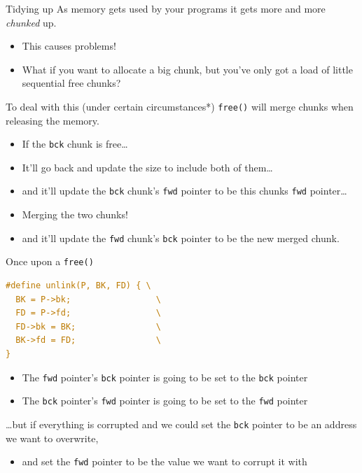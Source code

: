 \documentclass[9pt,aspectratio=169]{beamer}
\begin{document}
\begin{frame}[label={sec:orge1df077},fragile]{Tidying up}
 As memory gets used by your programs it gets more and more \emph{chunked} up.
\begin{itemize}
\item This causes problems!
\item What if you want to allocate a big chunk, but you've only got a load of little sequential free chunks?
\end{itemize}

To deal with this (under certain circumstances*) \texttt{free()} will merge chunks when releasing the memory.
\begin{itemize}
\item If the \texttt{bck} chunk is free\ldots{}
\item It'll go back and update the size to include both of them\ldots{}
\item and it'll update the \texttt{bck} chunk's \texttt{fwd} pointer to be this chunks \texttt{fwd} pointer\ldots{}
\item Merging the two chunks!
\item and it'll update the \texttt{fwd} chunk's \texttt{bck} pointer to be the new merged chunk.
\end{itemize}
\end{frame}
\begin{frame}[label={sec:org20d5d06},fragile]{Once upon a \texttt{free()}}
 \begin{lstlisting}[language=C,numbers=none]
  #define unlink(P, BK, FD) { \
  BK = P->bk;                 \
  FD = P->fd;                 \
  FD->bk = BK;                \
  BK->fd = FD;                \
}
\end{lstlisting}

\begin{itemize}
\item The \texttt{fwd} pointer's \texttt{bck} pointer is going to be set to the \texttt{bck} pointer
\item The \texttt{bck} pointer's \texttt{fwd} pointer is going to be set to the \texttt{fwd} pointer
\end{itemize}

\ldots{}but if everything is corrupted and we could set the \texttt{bck} pointer to be an address we want to overwrite,
\begin{itemize}
\item and set the \texttt{fwd} pointer to be the value we want to corrupt it with
\end{itemize}
\end{frame}
\end{document}
